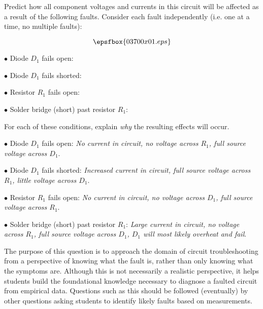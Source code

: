 

Predict how all component voltages and currents in this circuit will be affected as a result of the following faults.  Consider each fault independently (i.e. one at a time, no multiple faults):

$$\epsfbox{03700x01.eps}$$

\medskip
\item{$\bullet$} Diode $D_1$ fails open:
\vskip 5pt
\item{$\bullet$} Diode $D_1$ fails shorted:
\vskip 5pt
\item{$\bullet$} Resistor $R_1$ fails open:
\vskip 5pt
\item{$\bullet$} Solder bridge (short) past resistor $R_1$:
\medskip

For each of these conditions, explain {\it why} the resulting effects will occur.







\medskip
\item{$\bullet$} Diode $D_1$ fails open: {\it No current in circuit, no voltage across $R_1$, full source voltage across $D_1$}.
\vskip 5pt
\item{$\bullet$} Diode $D_1$ fails shorted: {\it Increased current in circuit, full source voltage across $R_1$, little voltage across $D_1$}.
\vskip 5pt
\item{$\bullet$} Resistor $R_1$ fails open: {\it No current in circuit, no voltage across $D_1$, full source voltage across $R_1$}.
\vskip 5pt
\item{$\bullet$} Solder bridge (short) past resistor $R_1$: {\it Large current in circuit, no voltage across $R_1$, full source voltage across $D_1$, $D_1$ will most likely overheat and fail}.
\medskip







The purpose of this question is to approach the domain of circuit troubleshooting from a perspective of knowing what the fault is, rather than only knowing what the symptoms are.  Although this is not necessarily a realistic perspective, it helps students build the foundational knowledge necessary to diagnose a faulted circuit from empirical data.  Questions such as this should be followed (eventually) by other questions asking students to identify likely faults based on measurements.




